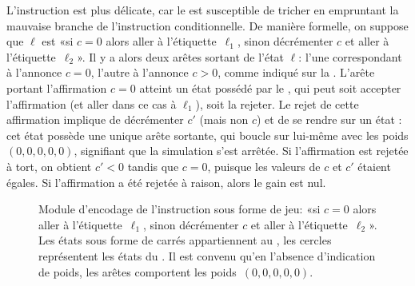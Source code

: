 L'instruction \tjztest est plus délicate, car le \jo est susceptible de tricher en empruntant la mauvaise branche de l'instruction conditionnelle.
De manière formelle, on suppose que $\ell$ est «si $c=0$ alors aller à l'étiquette~$\ell_1$, sinon décrémenter $c$ et aller à l'étiquette~$\ell_2$».
Il y a alors deux arêtes sortant de l'état $\ell$: l'une correspondant à l'annonce $c=0$, l'autre à l'annonce $c>0$, comme indiqué sur la .
L'arête portant l'affirmation $c=0$ atteint un état possédé par le \ji, qui peut soit accepter l'affirmation (et aller dans ce cas à $\ell_1$), soit la rejeter.
Le rejet de cette affirmation implique de décrémenter $c'$ (mais non $c$) et de se rendre sur un état \tjstop: cet état possède une unique arête sortante, qui boucle sur lui-même avec les poids $(0,0,0,0,0)$, signifiant que la simulation s'est arrêtée.
Si l'affirmation est rejetée à tort, on obtient $c'<0$ tandis que $c=0$, puisque les valeurs de $c$ et $c'$ étaient égales.
Si l'affirmation a été rejetée à raison, alors le gain est nul.

\begin{figure}[ht]
\centering
{}
\caption[Module d'encodage de l'instruction \tjztest sous forme de jeu.]{Module d'encodage de l'instruction \tjztest sous forme de jeu: «si $c=0$ alors aller à l'étiquette~$\ell_1$, sinon décrémenter $c$ et aller à l'étiquette~$\ell_2$». Les états sous forme de carrés appartiennent au \jo, les cercles représentent les états du \ji. Il est convenu qu'en l'absence d'indication de poids, les arêtes comportent les poids~$(0,0,0,0,0)$.}%
\label{tj:fig:zerotest}
\end{figure}

